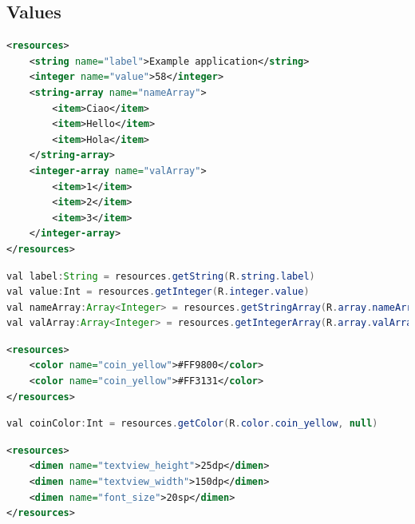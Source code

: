 \documentclass{article}
\begin{document}
\subsection*{Values}
\begin{center}
    \begin{lstlisting}[language=XML, title=Manipolazione di tipi primitivi e strutture dati in XML]
<resources>
    <string name="label">Example application</string>
    <integer name="value">58</integer>
    <string-array name="nameArray">
        <item>Ciao</item>
        <item>Hello</item>
        <item>Hola</item>
    </string-array>
    <integer-array name="valArray">
        <item>1</item>
        <item>2</item>
        <item>3</item>
    </integer-array>
</resources>
    \end{lstlisting}  
\end{center}
\begin{center}
    \begin{lstlisting}[language=JAVA, title=Manipolazione di tipi primitivi e strutture dati in Kotlin]
val label:String = resources.getString(R.string.label)
val value:Int = resources.getInteger(R.integer.value)
val nameArray:Array<Integer> = resources.getStringArray(R.array.nameArray)
val valArray:Array<Integer> = resources.getIntegerArray(R.array.valArray)
    \end{lstlisting}  
\end{center}
\begin{center}
    \begin{lstlisting}[language=XML, title=Manipolazione di risorse color in XML]
<resources>
    <color name="coin_yellow">#FF9800</color>
    <color name="coin_yellow">#FF3131</color>
</resources>
    \end{lstlisting}  
\end{center}
\begin{center}
    \begin{lstlisting}[language=JAVA, title=Manipolazione di risorse color in Kotlin]
val coinColor:Int = resources.getColor(R.color.coin_yellow, null)
    \end{lstlisting}  
\end{center}
\begin{center}
    \begin{lstlisting}[language=XML, title=Manipolazione di risorse dimension in XML]
<resources>
    <dimen name="textview_height">25dp</dimen>
    <dimen name="textview_width">150dp</dimen>
    <dimen name="font_size">20sp</dimen>
</resources>
    \end{lstlisting}  
\end{center}
\end{document}
